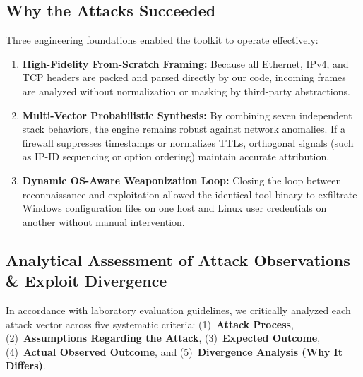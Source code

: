 \subsection{Why the Attacks Succeeded}
Three engineering foundations enabled the toolkit to operate effectively:
\begin{enumerate}
    \item \textbf{High-Fidelity From-Scratch Framing:} Because all Ethernet, IPv4, and TCP headers
    are packed and parsed directly by our code, incoming frames are analyzed without normalization
    or masking by third-party abstractions.
    \item \textbf{Multi-Vector Probabilistic Synthesis:} By combining seven independent stack
    behaviors, the engine remains robust against network anomalies. If a firewall suppresses
    timestamps or normalizes TTLs, orthogonal signals (such as IP-ID sequencing or option ordering)
    maintain accurate attribution.
    \item \textbf{Dynamic OS-Aware Weaponization Loop:} Closing the loop between reconnaissance and
    exploitation allowed the identical tool binary to exfiltrate Windows configuration files on
    one host and Linux user credentials on another without manual intervention.
\end{enumerate}

\subsection{Analytical Assessment of Attack Observations \& Exploit Divergence}
In accordance with laboratory evaluation guidelines, we critically analyzed each attack vector
across five systematic criteria: (1)~\textbf{Attack Process}, (2)~\textbf{Assumptions Regarding the
Attack}, (3)~\textbf{Expected Outcome}, (4)~\textbf{Actual Observed Outcome}, and (5)~\textbf{Divergence
Analysis (Why It Differs)}.

